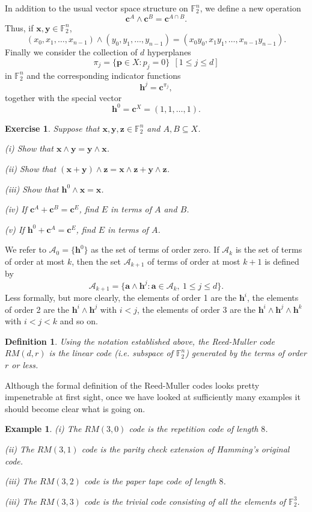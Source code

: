 \documentclass[12pt,a4paper]{article}
\theoremstyle{plain}
\newtheorem{definition}[theorem]{Definition}
\newtheorem{example}[theorem]{Example}
\newtheorem{exercise}[theorem]{Exercise}
\theoremstyle{definition}
\begin{document}
In addition to
the usual vector space structure on ${\mathbb F}_{2}^{n}$,
we define a new operation
\[{\mathbf c}^{A}\wedge{\mathbf c}^{B}
={\mathbf c}^{A\cap B}.\]
Thus, if ${\mathbf x},{\mathbf y}\in {\mathbb F}_{2}^{n}$,
\[(x_{0},x_{1},\dots,x_{n-1})\wedge(y_{0},y_{1},\dots,y_{n-1})
=(x_{0}y_{0},x_{1}y_{1},\dots,x_{n-1}y_{n-1}).\]
Finally we consider the collection of $d$ hyperplanes
\[\pi_{j}=\{{\mathbf p}\in X:p_{j}=0\}\ \  [1\leq j\leq d]\]
in ${\mathbb F}_{2}^{n}$
and the corresponding indicator functions
\[{\mathbf h}^{j}={\mathbf c}^{\pi_{j}},\]
together with the special vector
\[{\mathbf h}^{0}={\mathbf c}^{X}=(1,1,\dots,1).\]
\begin{exercise} Suppose that
${\mathbf x},{\mathbf y},{\mathbf z}\in {\mathbb F}_{2}^{n}$
and $A,B\subseteq X$.

(i) Show that
${\mathbf x}\wedge{\mathbf y}={\mathbf y}\wedge{\mathbf x}$.

(ii) Show that
$({\mathbf x}+{\mathbf y})\wedge{\mathbf z}
={\mathbf x}\wedge{\mathbf z}+{\mathbf y}\wedge{\mathbf z}$.

(iii) Show that ${\mathbf h}^{0}\wedge{\mathbf x}={\mathbf x}$.

(iv) If ${\mathbf c}^{A}+{\mathbf c}^{B}={\mathbf c}^{E}$,
find $E$ in terms of $A$ and $B$.

(v) If ${\mathbf h}^{0}+{\mathbf c}^{A}={\mathbf c}^{E}$,
find $E$ in terms of $A$.
\end{exercise}

We refer to ${\mathcal A}_{0}=\{{\mathbf h}^{0}\}$ as the
set of terms of order zero.
If ${\mathcal A}_{k}$ is the set of terms of order at most $k$,
then the set ${\mathcal A}_{k+1}$ of terms of order at most $k+1$
is defined by
\[{\mathcal A}_{k+1}=\{{\mathbf a}\wedge{\mathbf h}^{j}:
{\mathbf a}\in {\mathcal A}_{k},\ 1\leq j\leq d\}.\]
Less formally, but more clearly, the elements
of order 1 are the ${\mathbf h}^{i}$, the elements
of order 2 are the ${\mathbf h}^{i}\wedge{\mathbf h}^{j} $
with $i<j$, the elements
of order 3 are the
${\mathbf h}^{i}\wedge{\mathbf h}^{j}\wedge{\mathbf h}^{k}$
with $i<j<k$ and so on.
\begin{definition} Using the notation established
above, the Reed-Muller code  $RM(d,r)$ is the linear code
(i.e. subspace of ${\mathbb F}_{2}^{n}$) generated
by the terms of order $r$ or less.
\end{definition}

Although the formal definition of the Reed-Muller codes
looks pretty impenetrable at first sight, once
we have looked at sufficiently many examples
it should become clear what is going on.
\begin{example}
(i) The $RM(3,0)$ code is the repetition
code of length $8$.

(ii) The $RM(3,1)$ code is the parity check
extension of Hamming's original code.

(iii) The $RM(3,2)$ code is the paper tape code
of length $8$.

(iii) The $RM(3,3)$ code is the trivial code
consisting of all the elements of
${\mathbb F}^{3}_{2}$.
\end{example}
\end{document}
